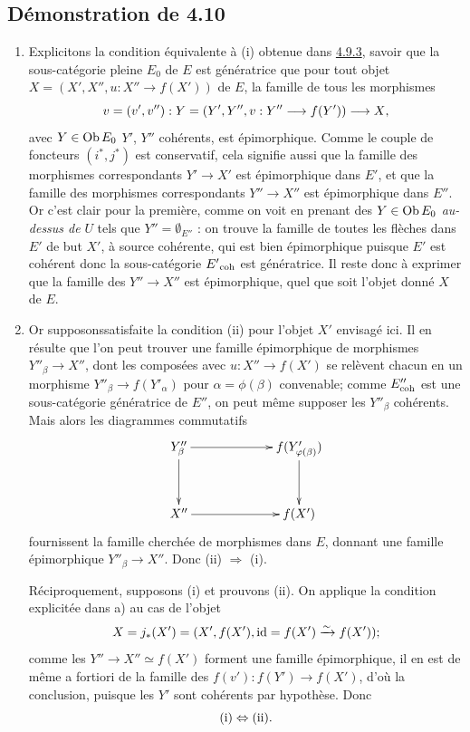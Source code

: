 \documentclass[10pt]{../fichiers-configuration-latex/smfart}
\begin{document}
\setcounter{subsection}{11}
\subsection{Démonstration de 4.10}

\begin{enumerate}
\renewcommand{\theenumi}{\alph{enumi}}
\renewcommand{\labelenumi}{\theenumi)}
\item Explicitons la condition équivalente à (i) obtenue dans \hyperref[VI.subsubsec4.9.3]{4.9.3},
  savoir que la sous-catégorie pleine $E_0$ de $E$ est génératrice \ie
  que pour tout objet $X = (X', X'', u : X''\to f(X'))$ de $E$, la
  famille de tous les morphismes
$$
v = (v', v'') : Y = (Y', Y'', v : Y''\to f(Y')) \to X {\quoi},
$$
avec $Y \in \Ob E_0$ \ie $Y'$, $Y''$ cohérents, est épimorphique. Comme
le couple de foncteurs $(i^{\ast}, j^{\ast})$ est conservatif, cela
signifie aussi que la famille des morphismes correspondants $Y' \to
X'$ est épimorphique dans $E'$, et que la famille des morphismes
correspondants $Y''\to X''$ est épimorphique dans $E''$. Or c'est
clair pour la première, comme on voit en prenant des $Y \in \Ob E_0$
\emph{au-dessus de} $U$ \ie tels que $Y'' = ∅_{E''}$ : on
trouve la famille de toutes les flèches dans $E'$ de but $X'$, à
source cohérente, qui est bien épimorphique puisque $E'$ est cohérent
donc la sous-catégorie ${E'}_{\coh}$ est génératrice. Il reste donc à
exprimer que la famille des $Y''\to X''$ est épimorphique, quel que
soit l'objet donné $X$ de $E$.

\item Or supposons\pageoriginale satisfaite la condition (ii) pour l'objet $X'$
  envisagé ici. Il en résulte que l'on peut trouver une famille
  épimorphique de morphismes $Y''_{\beta} \to X''$, dont les
  composées avec $u : X''\to f(X')$ se relèvent chacun en un morphisme
  $Y''_{\beta} \to f({Y'_{\alpha}})$ pour $\alpha = \phi(\beta)$
  convenable; comme $E''_{\coh}$ est une sous-catégorie génératrice
  de $E''$, on peut même supposer les $Y''_{\beta}$ cohérents. Mais
  alors les diagrammes commutatifs
\[
\xymatrix@C=2.25cm@R=1.25cm{
Y''_{\beta}  \ar[r] \ar[d]& f(Y'_{\varphi(\beta)}) \ar[d]\\
X'' \ar[r] & f(X')
}
\]
fournissent la famille cherchée de morphismes dans $E$, donnant une
famille épimorphique $Y''_{\beta} \to X''$. Donc (ii) $\Rightarrow$ (i).

Réciproquement, supposons (i) et prouvons (ii). On applique la
condition explicitée dans a) au cas de l'objet
$$
X = j_{\ast}(X') = (X', f(X'), \id = f(X') \xrightarrow{\sim} f(X')){\quoi};
$$
comme les $Y''\to X''\simeq f(X')$ forment une famille épimorphique,
il en est de même a fortiori de la famille des $f(v') : f(Y') \to
f(X')$, d'où la conclusion, puisque les $Y'$ sont cohérents par
hypothèse. Donc
$$
{\rm(i)} \Leftrightarrow {\rm(ii)}{\quoi}.
$$


\end{enumerate}
\end{document}
